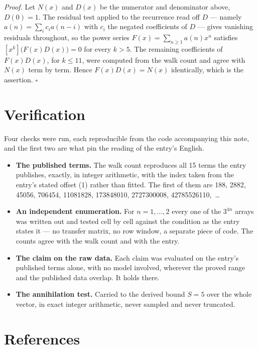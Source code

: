 \documentclass[11pt]{article}
\theoremstyle{definition}
\begin{document}
{\itshape Proof.} Let $N(x)$ and $D(x)$ be the numerator and denominator above, $D(0)=1$. The residual test applied to the recurrence read off $D$ --- namely $a(n) = \sum_i c_i a(n-i)$ with $c_i$ the negated coefficients of $D$ --- gives vanishing residuals throughout, so the power series $F(x)=\sum_{n\ge 1}a(n)x^n$ satisfies $[x^k]\bigl(F(x)D(x)\bigr) = 0$ for every $k > 5$. The remaining coefficients of $F(x)D(x)$, for $k \le 11$, were computed from the walk count and agree with $N(x)$ term by term. Hence $F(x)D(x) = N(x)$ identically, which is the assertion. $\square$

\section{Verification}

Four checks were run, each reproducible from the code accompanying this note, and the first two are what pin the reading of the entry's English.

\begin{itemize}

\item {\bfseries The published terms.} The walk count reproduces all 15 terms the entry publishes, exactly, in integer arithmetic, with the index taken from the entry's stated offset (1) rather than fitted. The first of them are 188, 2882, 45056, 706454, 11081828, 173848010, 2727300008, 42785526110,~\dots

\item {\bfseries An independent enumeration.} For $n = 1,\dots,2$ every one of the $3^{4n}$ arrays was written out and tested cell by cell against the condition as the entry states it --- no transfer matrix, no row window, a separate piece of code. The counts agree with the walk count and with the entry.

\item {\bfseries The claim on the raw data.} Each claim was evaluated on the entry's published terms alone, with no model involved, wherever the proved range and the published data overlap. It holds there.

\item {\bfseries The annihilation test.} Carried to the derived bound $S = 5$ over the whole vector, in exact integer arithmetic, never sampled and never truncated.

\end{itemize}

\section{References}
\end{document}
